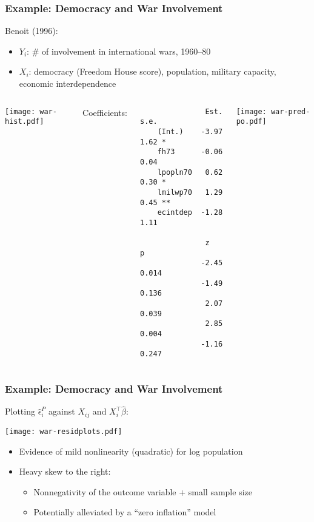 \documentclass{beamer}
\begin{document}
\begin{frame}[fragile]
\frametitle{Example: Democracy and War Involvement}
Benoit (1996):
\begin{itemize}
 \item $Y_i$: \# of involvement in international wars, 1960--80
 \item $X_i$: democracy (Freedom House score), population, military capacity, economic interdependence
\end{itemize}
\pause
\vspace{-1.75\baselineskip}
\begin{columns}
\begin{center}
\texttt{[image: war-hist.pdf]}
\end{center}
\pause
{}
{\scriptsize
\quad \qquad Coefficients:
\begin{verbatim}
               Est. s.e.
    (Int.)    -3.97 1.62 *
    fh73      -0.06 0.04
    lpopln70   0.62 0.30 *
    lmilwp70   1.29 0.45 **
    ecintdep  -1.28 1.11

               z    p
              -2.45 0.014
              -1.49 0.136
               2.07 0.039
               2.85 0.004
              -1.16 0.247
\end{verbatim}
}
\pause
{}
\begin{center}
\texttt{[image: war-pred-po.pdf]}
\end{center}

\end{columns}

\end{frame}




\begin{frame}
\frametitle{Example: Democracy and War Involvement}
Plotting $\hat\epsilon_i^P$ against $X_{ij}$ and $X_i^\top\hat\beta$:
\begin{center}
\texttt{[image: war-residplots.pdf]}
\end{center}
\pause
\begin{itemize}
\item Evidence of mild nonlinearity (quadratic) for log population
\item Heavy skew to the right:
  \begin{itemize}
  \item Nonnegativity of the outcome variable $+$ small sample size
  \item Potentially alleviated by a ``zero inflation'' model
  \end{itemize}
\end{itemize}
\end{frame}
\end{document}
